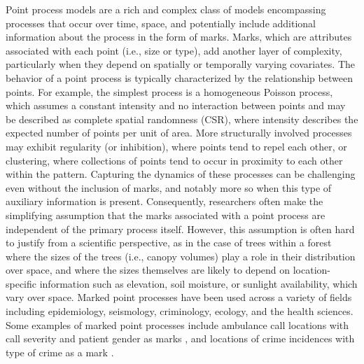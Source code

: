 Point process models are a rich and complex class of models encompassing
processes that occur over time, space, and potentially include
additional information about the process in the form of marks. Marks,
which are attributes associated with each point (i.e., size or type),
add another layer of complexity, particularly when they depend on
spatially or temporally varying covariates. The behavior of a point
process is typically characterized by the relationship between points.
For example, the simplest process is a homogeneous Poisson process,
which assumes a constant intensity and no interaction between points and
may be described as complete spatial randomness (CSR), where intensity
describes the expected number of points per unit of area. More
structurally involved processes may exhibit regularity (or inhibition),
where points tend to repel each other, or clustering, where collections
of points tend to occur in proximity to each other within the pattern.
Capturing the dynamics of these processes can be challenging even
without the inclusion of marks, and notably more so when this type of
auxiliary information is present. Consequently, researchers often make
the simplifying assumption that the marks associated with a point
process are independent of the primary process itself. However, this
assumption is often hard to justify from a scientific perspective, as in
the case of trees within a forest where the sizes of the trees (i.e.,
canopy volumes) play a role in their distribution over space, and where
the sizes themselves are likely to depend on location-specific
information such as elevation, soil moisture, or sunlight availability,
which vary over space. Marked point processes have been used across a
variety of fields including epidemiology, seismology, criminology,
ecology, and the health sciences. Some examples of marked point
processes include ambulance call locations with call severity and
patient gender as marks \citep{bayisaRegularisedSemiparametricComposite2023},
and locations of crime incidences with type of crime as a mark
\citep{mohlerSelfExcitingPointProcess2011}.

